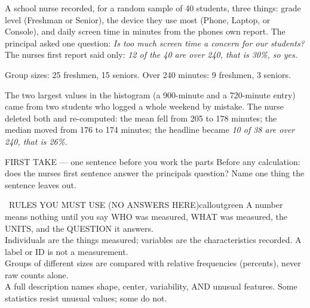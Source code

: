 \documentclass[11pt]{article}
\begin{document}


A school nurse recorded, for a random sample of 40 students, three things: grade level (Freshman or Senior), the device they use most (Phone, Laptop, or Console), and daily screen time in minutes from the phone\textquotesingle s own report. The principal asked one question: \emph{Is too much screen time a concern for our students?} The nurse\textquotesingle s first report said only: \emph{12 of the 40 are over 240, that is 30\%, so yes.}\par\smallskip Group sizes: 25 freshmen, 15 seniors. Over 240 minutes: 9 freshmen, 3 seniors.\par\smallskip The two largest values in the histogram (a 900-minute and a 720-minute entry) came from two students who logged a whole weekend by mistake. The nurse deleted both and re-computed: the mean fell from 205 to 178 minutes; the median moved from 176 to 174 minutes; the headline became \emph{10 of 38 are over 240, that is 26\%.}\par
\begin{center}
\end{center}
\begin{firsttakebox}{FIRST TAKE --- one sentence before you work the parts}
Before any calculation: does the nurse\textquotesingle s first sentence answer the principal\textquotesingle s question? Name one thing the sentence leaves out.
\workspace{0.35in}
\end{firsttakebox}

\begin{callout}{\IconBook\ RULES YOU MUST USE (NO ANSWERS HERE)}{calloutgreen}
A number means nothing until you say WHO was measured, WHAT was measured, the UNITS, and the QUESTION it answers.\\ Individuals are the things measured; variables are the characteristics recorded. A label or ID is not a measurement.\\ Groups of different sizes are compared with relative frequencies (percents), never raw counts alone.\\ A full description names shape, center, variability, AND unusual features. Some statistics resist unusual values; some do not.
\end{callout}
\end{document}
